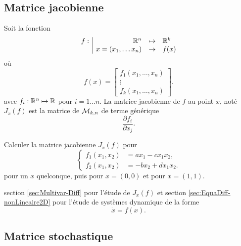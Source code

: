 \subsection{Matrice jacobienne}  \label{sec:MatJacob}

\begin{definition}
  Soit la fonction
  $$
  \begin{array}{r|rcl}
    f : & \mathbb{R}^n & \mapsto & \mathbb{R}^k \\
    & x = (x_1, \dots x_n) & \rightarrow & f(x)
  \end{array}
  $$
  où
  $$
  f(x) = \left[\begin{array}{c}
                f_1(x_1, \dots, x_n) \\
                \vdots \\
                f_k(x_1, \dots, x_n) 
               \end{array} \right].
  $$
  avec $f_i: \mathbb{R}^n \mapsto \mathbb{R}$ pour $i = 1 \dots n$.
  La matrice jacobienne de $f$ au point $x$, noté $J_x(f)$ est la matrice de $\mathcal{M}_{k, n}$ de terme générique
  $$
  \frac{\partial f_i}{\partial x_j}.
  $$
\end{definition}

\begin{exercise*}
  Calculer la matrice jacobienne $J_x(f)$ pour
  $$
  \left\{\begin{array}{rl}
          f_1(x_1, x_2) & = a x_1 - c x_1 x_2, \\
          f_2(x_1, x_2) & = -b x_2 + d x_1 x_2.
         \end{array} \right.
  $$
pour un $x$ quelconque, puis pour $x = (0, 0)$ et pour $x=(1, 1)$.
\end{exercise*}

\remark section \ref{sec:Multivar-Diff} pour l'étude de $J_x(f)$ et section \ref{sec:EquaDiff-nonLineaire2D} pour l'étude de systèmes dynamique de la forme
$$
\dot{x} = f(x).
$$

\subsection{Matrice stochastique}  \label{sec:MatStoch}

